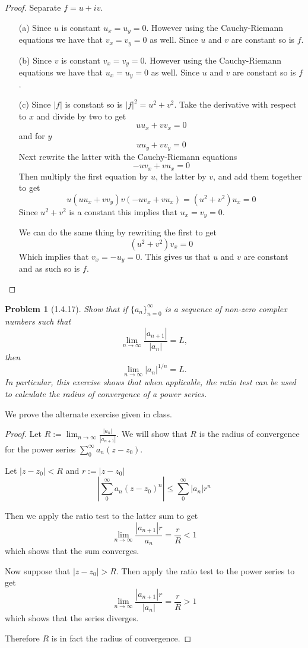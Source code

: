 \documentclass[10pt]{article}
\newcommand{\sk}{\vskip 10mm}
\theoremstyle{plain}
\newtheorem{problem}{Problem}
\theoremstyle{remark}
\begin{document}
\begin{proof}
  Separate $f=u+iv$.
  \begin{itemize}
  \item[(a)] Since $u$ is constant $u_x=u_y=0$. However using the
    Cauchy-Riemann equations we have that $v_x=v_y=0$ as well. Since
    $u$ and $v$ are constant so is $f$.
  \item[(b)] Since $v$ is constant $v_x=v_y=0$. However using the
    Cauchy-Riemann equations we have that $u_x=u_y=0$ as well. Since
    $u$ and $v$ are constant so is $f$.
  \item[(c)] Since $|f|$ is constant so is $|f|^2=u^2+v^2$. Take the
    derivative with respect to $x$ and divide by two to get
    \[
      uu_x+vv_x=0
    \]
    and for $y$
    \[
      uu_y+vv_y=0
    \]
    Next rewrite the latter with the Cauchy-Riemann equations
    \[
      -uv_x+vu_x=0
    \]
    Then multiply the first equation by $u$, the latter by $v$,
    and add them together to get
    \[
      u(uu_x+vv_y)v(-uv_x+vu_x)=(u^2+v^2)u_x=0
    \]
    Since $u^2+v^2$ is a constant this implies that $u_x=v_y=0$.

    We can do the same thing by rewriting the first to get
    \[
      (u^2+v^2)v_x=0
    \]
    Which implies that $v_x=-u_y=0$. This gives us that
    $u$ and $v$ are constant and as such so is $f$.
  \end{itemize}
\end{proof}

\sk

\begin{problem}[1.4.17]
  Show that if $\{a_n\}_{n=0}^\infty$ is a sequence of non-zero complex numbers
  such that
  \[
    \lim_{n\rightarrow\infty}\frac{|a_{n+1}|}{|a_n|}=L,
  \]
  then
  \[
    \lim_{n\rightarrow\infty}|a_n|^{1/n}=L.
  \]
  In particular, this exercise shows that when applicable, the ratio test
  can be used to calculate the radius of convergence of a power series.
\end{problem}

We prove the alternate exercise given in class.

\begin{proof}
  Let $R:=\lim_{n\rightarrow\infty}\frac{|a_n|}{|a_{n+1}|}$. We will show
  that $R$ is the radius of convergence for the power series
  $\sum_0^\infty a_n(z-z_0)$.

  Let $|z-z_0|<R$ and $r:=|z-z_0|$
  \[
    \left|
      \sum_0^\infty a_n(z-z_0)^n
    \right|
    \leq \sum_0^\infty |a_n|r^n
  \]

  Then we apply the ratio test to the latter sum to get
  \[
    \lim_{n\rightarrow\infty}\frac{|a_{n+1}|r}{a_n}=\frac{r}{R}<1
  \]
  which shows that the sum converges.

  Now suppose that $|z-z_0|>R$. Then apply the ratio test to
  the power series to get
  \[
    \lim_{n\rightarrow\infty}\frac{|a_{n+1}|r}{|a_n|} = \frac{r}{R}>1
  \]
  which shows that the series diverges.

  Therefore $R$ is in fact the radius of convergence.
\end{proof}
\end{document}
